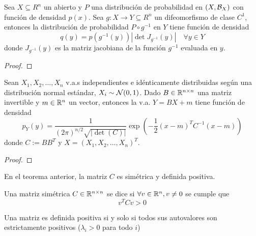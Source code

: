 \begin{prop}
    Sea $X\subseteq R^n$ un abierto y $P$ una distribución de probabilidad en $(X, \mathcal{B}_X)$ con función de densidad $p(x)$. Sea $g: X \to Y \subseteq R^n$ un difeomorfismo de clase $C^1$, entonces la distribución de probabilidad $P \circ g^{-1}$ en $Y$ tiene función de densidad
    \begin{equation*}
        q(y) = p(g^{-1}(y)) \left| \det J_{g^{-1}}(y) \right| \quad \forall y \in Y
    \end{equation*}
    donde $J_{g^{-1}}(y)$ es la matriz jacobiana de la función $g^{-1}$ evaluada en $y$.
    \begin{proof}
    \end{proof}
\end{prop}

\begin{teo}
    Sean $X_1, X_2, \ldots, X_n$ v.a.s independientes e idénticamente distribuidas según una distribución normal estándar, $X_i \sim \mathcal{N}(0,1)$. Dado $B\in \mathbb{R}^{n\times n}$ una matriz invertible y $m\in \mathbb{R}^n$ un vector, entonces la v.a. $Y=BX + m$ tiene función de densidad
    \begin{equation*}
        p_Y(y) = \dfrac{1}{(2\pi)^{n/2} \sqrt{|\det(C)|}} \exp\left( -\dfrac{1}{2} (x - m)^T C^{-1} (x - m) \right)
    \end{equation*}
    donde $C:=B B^T$ y $X=(X_1, X_2, \ldots, X_n)^T$.
    \begin{proof}
    \end{proof}
\end{teo}

\begin{observacion}
    En el teorema anterior, la matriz $C$ es simétrica y definida positiva.
\end{observacion}

\begin{definicion}
    Una matriz simétrica $C \in \mathbb{R}^{n\times n}$ se dice  si $\forall v\in \mathbb{R}^n, v\neq 0$ se cumple que
    \begin{equation*}
        v^T C v > 0
    \end{equation*}
\end{definicion}

\begin{prop}
    Una matriz es definida positiva si y solo si todos sus autovalores son estrictamente positivos ($\lambda_i > 0$ para todo $i$)
\end{prop}

